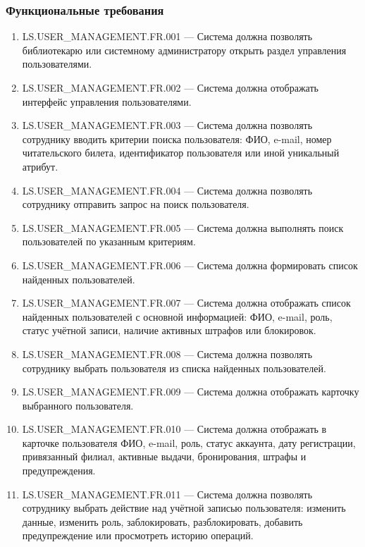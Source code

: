 \documentclass[12pt,a4paper]{article}
\begin{document}
	\subsubsection{Функциональные требования}
	
	\begin{enumerate}
		\item LS.USER\_MANAGEMENT.FR.001 --- Система должна позволять библиотекарю
		или системному администратору открыть раздел управления пользователями.
		
		\item LS.USER\_MANAGEMENT.FR.002 --- Система должна отображать интерфейс
		управления пользователями.
		
		\item LS.USER\_MANAGEMENT.FR.003 --- Система должна позволять сотруднику
		вводить критерии поиска пользователя: ФИО, e-mail, номер читательского билета,
		идентификатор пользователя или иной уникальный атрибут.
		
		\item LS.USER\_MANAGEMENT.FR.004 --- Система должна позволять сотруднику
		отправить запрос на поиск пользователя.
		
		\item LS.USER\_MANAGEMENT.FR.005 --- Система должна выполнять поиск
		пользователей по указанным критериям.
		
		\item LS.USER\_MANAGEMENT.FR.006 --- Система должна формировать список
		найденных пользователей.
		
		\item LS.USER\_MANAGEMENT.FR.007 --- Система должна отображать список
		найденных пользователей с основной информацией: ФИО, e-mail, роль, статус
		учётной записи, наличие активных штрафов или блокировок.
		
		\item LS.USER\_MANAGEMENT.FR.008 --- Система должна позволять сотруднику
		выбрать пользователя из списка найденных пользователей.
		
		\item LS.USER\_MANAGEMENT.FR.009 --- Система должна отображать карточку
		выбранного пользователя.
		
		\item LS.USER\_MANAGEMENT.FR.010 --- Система должна отображать в карточке
		пользователя ФИО, e-mail, роль, статус аккаунта, дату регистрации,
		привязанный филиал, активные выдачи, бронирования, штрафы и предупреждения.
		
		\item LS.USER\_MANAGEMENT.FR.011 --- Система должна позволять сотруднику
		выбрать действие над учётной записью пользователя: изменить данные, изменить
		роль, заблокировать, разблокировать, добавить предупреждение или просмотреть
		историю операций.
		

\end{enumerate}
\end{document}
